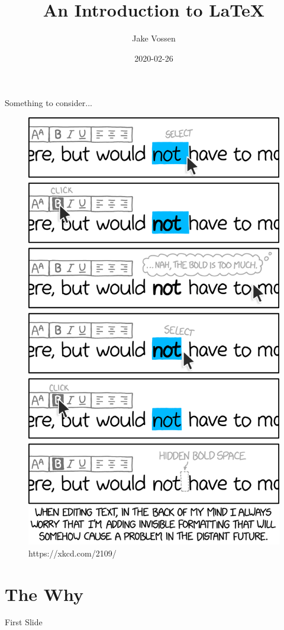 \documentclass{beamer}
\title{An Introduction to \LaTeX}
\author{Jake Vossen}
\institute{Colorado School of Mines - acm-w}
\date{2020-02-26}
\begin{document}
\begin{frame}{Something to consider...}
    \begin{figure}
    \includegraphics[scale=.13]{invisible_formatting_2x.png}
    \caption{https://xkcd.com/2109/}
  \end{figure}
\end{frame}
\begin{frame}
  \titlepage
\end{frame}


\section{The Why}

\begin{frame}{First Slide}


\vskip 1cm

\end{frame}
\end{document}
